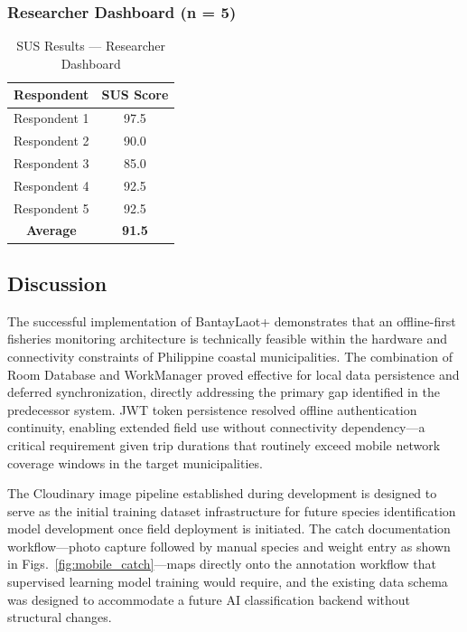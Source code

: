 \documentclass[journal]{IEEEtran}
\begin{document}
\subsubsection{Researcher Dashboard (n = 5)}

\begin{table}[h]
\centering
\caption{SUS Results --- Researcher Dashboard}
\label{tab:sus_researcher}
\begin{tabular}{@{}cc@{}}
\toprule
\textbf{Respondent} & \textbf{SUS Score} \\
\midrule
Respondent 1 & 97.5 \\
Respondent 2 & 90.0 \\
Respondent 3 & 85.0 \\
Respondent 4 & 92.5 \\
Respondent 5 & 92.5 \\
\midrule
\textbf{Average} & \textbf{91.5} \\
\bottomrule
\end{tabular}
\end{table}

\subsection{Discussion}

The successful implementation of BantayLaot+ demonstrates that an offline-first fisheries
monitoring architecture is technically feasible within the hardware and connectivity
constraints of Philippine coastal municipalities. The combination of Room Database and
WorkManager proved effective for local data persistence and deferred synchronization,
directly addressing the primary gap identified in the predecessor system. JWT token
persistence resolved offline authentication continuity, enabling extended field use
without connectivity dependency---a critical requirement given trip durations that
routinely exceed mobile network coverage windows in the target municipalities.

The Cloudinary image pipeline established during development is designed to serve as the
initial training dataset infrastructure for future species identification model
development once field deployment is initiated. The catch documentation workflow---photo
capture followed by manual species and weight entry as shown in
Figs.~\ref{fig:mobile_catch}---maps directly onto the
annotation workflow that supervised learning model training would require, and the
existing data schema was designed to accommodate a future AI classification backend
without structural changes.
\end{document}
